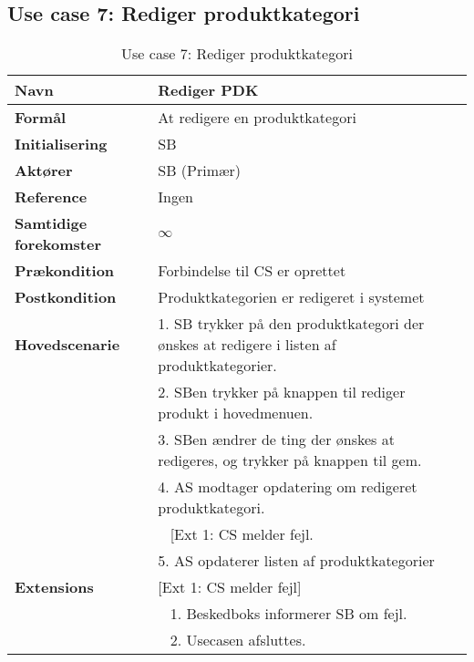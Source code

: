 \subsection{Use case 7: Rediger produktkategori}


\begin{table}[H]
\begin{tabularx}{\textwidth}{|l|X|}
\hline
\textbf{Navn}					& Rediger \gls{PDK} \\\hline
\textbf{Formål}					& At redigere en produktkategori \\\hline
\textbf{Initialisering}			& \gls{SB} \\\hline
\textbf{Aktører}				& \gls{SB} (Primær)\\\hline
\textbf{Reference}				& Ingen \\\hline
								
\textbf{Samtidige forekomster}	& $\infty$ \\\hline

\textbf{Prækondition}			& Forbindelse til \gls{CS} er oprettet \\\hline

\textbf{Postkondition}			& Produktkategorien er redigeret i systemet \\\hline

\textbf{Hovedscenarie}			& 1. \gls{SB} trykker på den produktkategori der ønskes at redigere i listen af produktkategorier. \\		
								& 2. \gls{SB}en trykker på knappen til rediger produkt i hovedmenuen.\\
								& 3.  \gls{SB}en ændrer de ting der ønskes at redigeres, og trykker på knappen til gem. \\
								& 4. \gls{AS} modtager opdatering om redigeret produktkategori. \\
								& ~ [Ext 1: \gls{CS} melder fejl.\\
								& 5. \gls{AS} opdaterer listen af produktkategorier \\\hline

\textbf{Extensions}							
								& [Ext 1: \gls{CS} melder fejl]\\
								& ~ 1. Beskedboks informerer \gls{SB} om fejl.\\
								& ~ 2. Usecasen afsluttes.\\\hline
\end{tabularx}
\caption{Use case 7: Rediger produktkategori}
\label{tab:UCrpk}
\end{table}